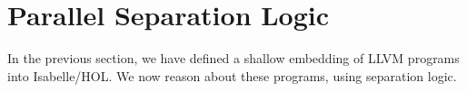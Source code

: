 \documentclass[sn-mathphys,Numbered]{sn-jnl}
\theoremstyle{thmstyleone}%
\theoremstyle{definition}%
\theoremstyle{thmstylethree}%
\begin{document}
%
%
%
%
%
%

  \section{Parallel Separation Logic}\label{sec:seplogic}
  In the previous section, we have defined a shallow embedding of LLVM programs into Isabelle/HOL.
  We now reason about these programs, using separation logic.
\end{document}

